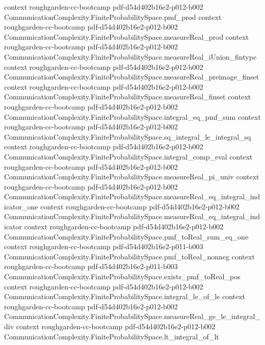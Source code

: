 \begin{theorem}
  {context}
  {roughgarden-cc-bootcamp}
  {pdf-d54d402b16e2-p012-b002}
\proofstep
  {CommunicationComplexity.FiniteProbabilitySpace.pmf_prod}
  {context}
  {roughgarden-cc-bootcamp}
  {pdf-d54d402b16e2-p012-b002}
\proofstep
  {CommunicationComplexity.FiniteProbabilitySpace.measureReal_prod}
  {context}
  {roughgarden-cc-bootcamp}
  {pdf-d54d402b16e2-p012-b002}
\proofstep
  {CommunicationComplexity.FiniteProbabilitySpace.measureReal_iUnion_fintype}
  {context}
  {roughgarden-cc-bootcamp}
  {pdf-d54d402b16e2-p012-b002}
\proofstep
  {CommunicationComplexity.FiniteProbabilitySpace.measureReal_preimage_finset}
  {context}
  {roughgarden-cc-bootcamp}
  {pdf-d54d402b16e2-p012-b002}
\proofstep
  {CommunicationComplexity.FiniteProbabilitySpace.measureReal_finset}
  {context}
  {roughgarden-cc-bootcamp}
  {pdf-d54d402b16e2-p012-b002}
\proofstep
  {CommunicationComplexity.FiniteProbabilitySpace.integral_eq_pmf_sum}
  {context}
  {roughgarden-cc-bootcamp}
  {pdf-d54d402b16e2-p012-b002}
\proofstep
  {CommunicationComplexity.FiniteProbabilitySpace.sq_integral_le_integral_sq}
  {context}
  {roughgarden-cc-bootcamp}
  {pdf-d54d402b16e2-p012-b002}
\proofstep
  {CommunicationComplexity.FiniteProbabilitySpace.integral_comp_eval}
  {context}
  {roughgarden-cc-bootcamp}
  {pdf-d54d402b16e2-p012-b002}
\proofstep
  {CommunicationComplexity.FiniteProbabilitySpace.measureReal_pi_univ}
  {context}
  {roughgarden-cc-bootcamp}
  {pdf-d54d402b16e2-p012-b002}
\proofstep
  {CommunicationComplexity.FiniteProbabilitySpace.measureReal_eq_integral_indicator_one}
  {context}
  {roughgarden-cc-bootcamp}
  {pdf-d54d402b16e2-p012-b002}
\proofstep
  {CommunicationComplexity.FiniteProbabilitySpace.measureReal_eq_integral_indicator}
  {context}
  {roughgarden-cc-bootcamp}
  {pdf-d54d402b16e2-p012-b002}
\proofstep
  {CommunicationComplexity.FiniteProbabilitySpace.pmf_toReal_sum_eq_one}
  {context}
  {roughgarden-cc-bootcamp}
  {pdf-d54d402b16e2-p011-b003}
\proofstep
  {CommunicationComplexity.FiniteProbabilitySpace.pmf_toReal_nonneg}
  {context}
  {roughgarden-cc-bootcamp}
  {pdf-d54d402b16e2-p011-b003}
\proofstep
  {CommunicationComplexity.FiniteProbabilitySpace.exists_pmf_toReal_pos}
  {context}
  {roughgarden-cc-bootcamp}
  {pdf-d54d402b16e2-p012-b002}
\proofstep
  {CommunicationComplexity.FiniteProbabilitySpace.integral_le_of_le}
  {context}
  {roughgarden-cc-bootcamp}
  {pdf-d54d402b16e2-p012-b002}
\proofstep
  {CommunicationComplexity.FiniteProbabilitySpace.measureReal_ge_le_integral_div}
  {context}
  {roughgarden-cc-bootcamp}
  {pdf-d54d402b16e2-p012-b002}
\proofstep
  {CommunicationComplexity.FiniteProbabilitySpace.lt_integral_of_lt}

\end{theorem}
